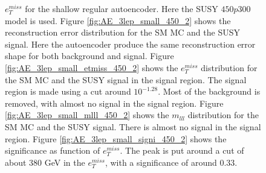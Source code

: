 \begin{figure}[H]
{    $e_T^{miss}$ for the shallow regular autoencoder. Here the SUSY $450p300$ model is used. 
    Figure \ref{fig:AE_3lep_small_450_2} shows the reconstruction error 
    distribution for the SM MC and the SUSY signal. Here the autoencoder produce the same reconstruction error shape for both background and 
    signal. Figure \ref{fig:AE_3lep_small_etmiss_450_2} shows the $e_T^{miss}$ distribution for the SM MC and the SUSY signal in the signal region. 
    The signal region is made using a cut around $10^{-1.28}$. Most of the background is removed, with almost no signal in the signal region.
    Figure \ref{fig:AE_3lep_small_mlll_450_2} shows the $m_{lll}$ distribution for the SM MC and the SUSY signal. 
    There is almost no signal in the signal region. Figure \ref{fig:AE_3lep_small_signi_450_2} shows the significance as function of
    $e_T^{miss}$. The peak is put around a cut of about 380 GeV in the $e_T^{miss}$, with a significance of around $0.33$.}
    \label{fig:AE_3lep_small_rec_sig_signi_450_2}
\end{figure}








